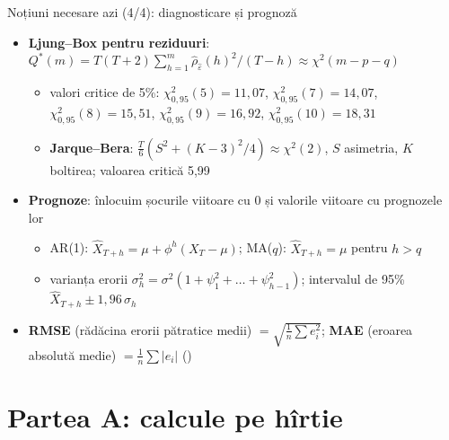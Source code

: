 \begin{frame}{Noțiuni necesare azi (4/4): diagnosticare și prognoză}
\itemsize{\small}
\begin{itemize}
    \item \textbf{Ljung--Box pentru reziduuri}: $Q^*(m) = T(T + 2)\sum_{h=1}^{m}\hat\rho_{\hat\varepsilon}(h)^2/(T - h) \approx \chi^2(m - p - q)$
    \begin{itemize}
        \item valori critice de 5\%: $\chi^2_{0{,}95}(5) = 11{,}07$, $\chi^2_{0{,}95}(7) = 14{,}07$, $\chi^2_{0{,}95}(8) = 15{,}51$, $\chi^2_{0{,}95}(9) = 16{,}92$, $\chi^2_{0{,}95}(10) = 18{,}31$
        \item \textbf{Jarque--Bera}: $\frac{T}{6}(S^2 + (K - 3)^2/4) \approx \chi^2(2)$, $S$ asimetria, $K$ boltirea; valoarea critică 5,99
    \end{itemize}
    \item \textbf{Prognoze}: înlocuim șocurile viitoare cu 0 și valorile viitoare cu prognozele lor
    \begin{itemize}
        \item AR(1): $\hat X_{T+h} = \mu + \phi^h(X_T - \mu)$; MA($q$): $\hat X_{T+h} = \mu$ pentru $h > q$
        \item varianța erorii $\sigma_h^2 = \sigma^2(1 + \psi_1^2 + \dots + \psi_{h-1}^2)$; intervalul de 95\% $\hat X_{T+h} \pm 1{,}96\,\sigma_h$
    \end{itemize}
    \item \textbf{RMSE} (rădăcina erorii pătratice medii) $= \sqrt{\frac1n\sum e_i^2}$; \textbf{MAE} (eroarea absolută medie) $= \frac1n\sum|e_i|$ ()
\end{itemize}
\end{frame}


\section{Partea A: calcule pe hîrtie}

